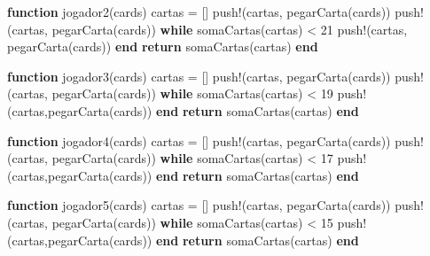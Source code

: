 \documentclass[
  letterpaper,
  DIV=11,
  numbers=noendperiod]{scrreprt}
\newenvironment{Shaded}{\begin{snugshade}}{\end{snugshade}}
\newcommand{\ControlFlowTok}[1]{\textcolor[rgb]{0.00,0.23,0.31}{\textbf{#1}}}
\newcommand{\FloatTok}[1]{\textcolor[rgb]{0.68,0.00,0.00}{#1}}
\newcommand{\FunctionTok}[1]{\textcolor[rgb]{0.28,0.35,0.67}{#1}}
\newcommand{\KeywordTok}[1]{\textcolor[rgb]{0.00,0.23,0.31}{\textbf{#1}}}
\newcommand{\NormalTok}[1]{\textcolor[rgb]{0.00,0.23,0.31}{#1}}
\newcommand{\OperatorTok}[1]{\textcolor[rgb]{0.37,0.37,0.37}{#1}}
\begin{document}
\begin{Shaded}
\begin{Highlighting}[]
\KeywordTok{function} \FunctionTok{jogador2}\NormalTok{(cards)}
\NormalTok{  cartas }\OperatorTok{=}\NormalTok{ []}
  \FunctionTok{push!}\NormalTok{(cartas, }\FunctionTok{pegarCarta}\NormalTok{(cards))}
  \FunctionTok{push!}\NormalTok{(cartas, }\FunctionTok{pegarCarta}\NormalTok{(cards))}
  \ControlFlowTok{while} \FunctionTok{somaCartas}\NormalTok{(cartas) }\OperatorTok{\textless{}} \FloatTok{21}
    \FunctionTok{push!}\NormalTok{(cartas, }\FunctionTok{pegarCarta}\NormalTok{(cards))}
  \ControlFlowTok{end}
  \ControlFlowTok{return} \FunctionTok{somaCartas}\NormalTok{(cartas)}
\KeywordTok{end}

\KeywordTok{function} \FunctionTok{jogador3}\NormalTok{(cards)}
\NormalTok{  cartas }\OperatorTok{=}\NormalTok{ []}
  \FunctionTok{push!}\NormalTok{(cartas, }\FunctionTok{pegarCarta}\NormalTok{(cards))}
  \FunctionTok{push!}\NormalTok{(cartas, }\FunctionTok{pegarCarta}\NormalTok{(cards))}
  \ControlFlowTok{while} \FunctionTok{somaCartas}\NormalTok{(cartas) }\OperatorTok{\textless{}} \FloatTok{19}
    \FunctionTok{push!}\NormalTok{(cartas,}\FunctionTok{pegarCarta}\NormalTok{(cards))}
  \ControlFlowTok{end}
  \ControlFlowTok{return} \FunctionTok{somaCartas}\NormalTok{(cartas)}
\KeywordTok{end}

\KeywordTok{function} \FunctionTok{jogador4}\NormalTok{(cards)}
\NormalTok{  cartas }\OperatorTok{=}\NormalTok{ []}
  \FunctionTok{push!}\NormalTok{(cartas, }\FunctionTok{pegarCarta}\NormalTok{(cards))}
  \FunctionTok{push!}\NormalTok{(cartas, }\FunctionTok{pegarCarta}\NormalTok{(cards))}
  \ControlFlowTok{while} \FunctionTok{somaCartas}\NormalTok{(cartas) }\OperatorTok{\textless{}} \FloatTok{17}
    \FunctionTok{push!}\NormalTok{(cartas,}\FunctionTok{pegarCarta}\NormalTok{(cards))}
  \ControlFlowTok{end}
  \ControlFlowTok{return} \FunctionTok{somaCartas}\NormalTok{(cartas)}
\KeywordTok{end}

  \KeywordTok{function} \FunctionTok{jogador5}\NormalTok{(cards)}
\NormalTok{    cartas }\OperatorTok{=}\NormalTok{ []}
    \FunctionTok{push!}\NormalTok{(cartas, }\FunctionTok{pegarCarta}\NormalTok{(cards))}
    \FunctionTok{push!}\NormalTok{(cartas, }\FunctionTok{pegarCarta}\NormalTok{(cards))}
    \ControlFlowTok{while} \FunctionTok{somaCartas}\NormalTok{(cartas) }\OperatorTok{\textless{}} \FloatTok{15}
      \FunctionTok{push!}\NormalTok{(cartas,}\FunctionTok{pegarCarta}\NormalTok{(cards))}
    \ControlFlowTok{end}
    \ControlFlowTok{return} \FunctionTok{somaCartas}\NormalTok{(cartas)}
  \KeywordTok{end}


\end{Highlighting}
\end{Shaded}
\end{document}
